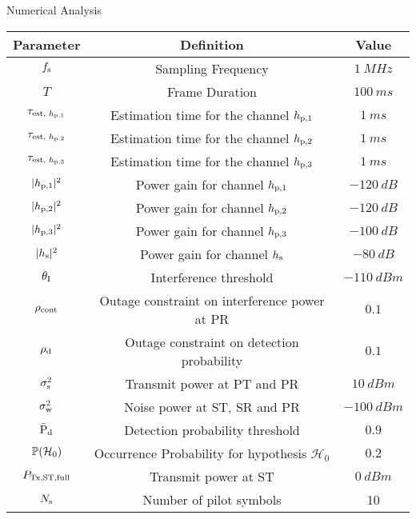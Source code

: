 \documentclass[12pt]{beamer}
\newcommand{\fs}[2]{\fontsize{#1 pt}{#2}\selectfont}
\begin{document}
\begin{frame}{Numerical Analysis}
\fs{8}{8}
\begin{center}
\renewcommand{\arraystretch}{1.3}
\begin{tabular}{c||c|c}
\hline
\bfseries Parameter & \bfseries Definition & \bfseries Value \\
\hline\hline
$f_{\text{s}}$ & Sampling Frequency & $\SI{1}{MHz}$ \\
$T$ & Frame Duration & $\SI{100}{ms}$ \\
$\tau_{\text{est, $h_{\text{p,1}}$}}$ & Estimation time for the channel $h_{\text{p,1}}$ & $\SI{1}{ms}$ \\
$\tau_{\text{est, $h_{\text{p,2}}$}}$ & Estimation time for the channel $h_{\text{p,2}}$ & $\SI{1}{ms}$ \\
$\tau_{\text{est, $h_{\text{p,3}}$}}$ & Estimation time for the channel $h_{\text{p,3}}$ & $\SI{1}{ms}$ \\
$|h_{\text{p,1}}|^2$ & Power gain for channel $h_{\text{p,1}}$ & $\SI{-120}{dB}$ \\
$|h_{\text{p,2}}|^2$ & Power gain for channel $h_{\text{p,2}}$ & $\SI{-120}{dB}$ \\
$|h_{\text{p,3}}|^2$ & Power gain for channel $h_{\text{p,3}}$ &$\SI{-100}{dB}$ \\
$|h_{\text{s}}|^2$ & Power gain for channel $h_{\text{s}}$ &$\SI{-80}{dB}$ \\
$\theta_{\text{I}}$ & Interference threshold &$\SI{-110}{dBm}$ \\
$\rho_{\text{cont}}$ & Outage constraint on interference power at PR& $0.1$ \\
$\rho_{\text{d}}$ & Outage constraint on detection probability & $0.1$ \\
$\sigma^2_{\text{s}}$ & Transmit power at PT and PR&$\SI{10}{dBm}$ \\
$\sigma^2_{\text{w}}$ & Noise power at ST, SR and PR &$\SI{-100}{dBm}$ \\
$\bar{\text{P}}_{\text{d}}$ & Detection probability threshold  &$0.9$ \\
$\mathbb P(\mathcal{H}_0)$ & Occurrence Probability for hypothesis $\mathcal H_0$ & $0.2$ \\
$P_{\text{Tx,ST,full}}$ & Transmit power at ST &$\SI{0}{dBm}$ \\
$N_{\text{s}}$ & Number of pilot symbols & 10 \\ \hline
\end{tabular}
\end{center}
\end{frame}
\end{document}
